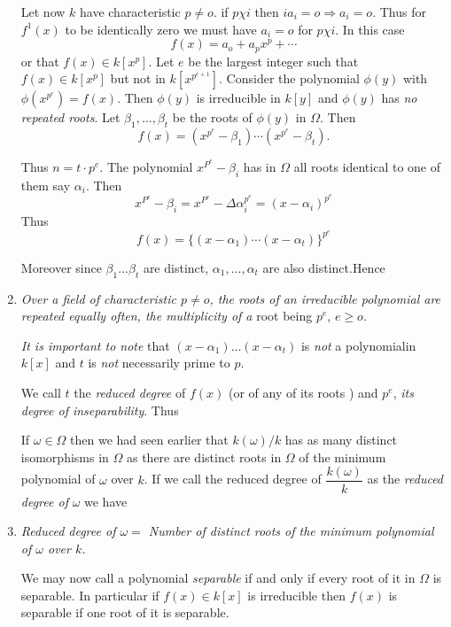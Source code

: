 \begin{enumerate}[1)]
Let now $k$ have characteristic $p \neq o$. if $p \chi i$ then $i a_i
= o \Rightarrow a_i = o$. Thus for $f^1 (x)$ to be identically zero we
must have $a_i = o$ for $p \chi i$. In this case 
$$
f(x) = a_o + a_p x^p + \cdots
$$
or that $f(x) \in k[x^p]$. Let $e$ be the largest integer such that $f
(x) \in k[ x^p ]$ but not in $k [x^{p^{e + 1}}]$. Consider the
polynomial $\phi (y)$ with $\phi (x^{p^e}) = f(x)$. Then $\phi (y)$ is
irreducible in $k[y]$ and $\phi (y)$ has \textit{no repeated
  roots}. Let $\beta_1, \ldots , \beta_t$ be the roots of $\phi (y)$
in $\Omega$. Then 
$$
f(x) = ( x^{p^e} - \beta_1 ) \cdots (x^{p^e} - \beta_t).
$$

Thus $n = t \cdot p^e$. The polynomial $x^{P^e} - \beta_i$ has in $\Omega$
all roots identical to one of them say  $\alpha_i$. Then 
$$
x^{P^e} - \beta_i = x^{P^e} - \Delta \alpha^{p^e}_i = (x - \alpha_i)^{p^e}
$$
Thus 
$$
f(x) = \{ (x - \alpha_1) \cdots (x - \alpha_t ) \}^{p^e}
$$


Moreover since $\beta_1 \ldots \beta_t$ are distinct, $\alpha_1 ,
\ldots ,\alpha_t$ are also distinct.\break Hence  

\item \textit{Over a field of characteristic $p \neq o$, the roots of
  an irreducible polynomial are repeated equally often, the
  multiplicity of a} root being $p^e$, $e \geq o$. 

\textit{It is important to note} that $(x - \alpha_1) \ldots (x  -
\alpha_t)$ is \textit{not} a polynomial\pageoriginale in $k[x]$ and
$t$ is \textit{not} necessarily prime to $p$.   

We call $t$ the \textit{reduced degree} of $f(x)$ (or of any of its
roots ) and $p^e$, \textit{its degree of inseparability}. Thus


If $\omega \in \Omega$ then we had seen earlier that $k(\omega) / k$
has as many distinct isomorphisms in $\Omega$ as there are distinct
roots in $\Omega$ of the minimum polynomial of $\omega$ over $k$. If
we call the reduced degree of $\dfrac{k(\omega)}{k}$ as the \textit{reduced 
  degree of} $\omega$ we have  

\item \textit{Reduced degree of $\omega = $ Number of distinct roots
  of the minimum polynomial of $\omega$ over $k$.} 

We may now call a polynomial \textit{separable} if and only if every
root of it in $\Omega$ is separable. In particular if $f(x) \in k[x]$
is irreducible then $f(x)$ is separable if one root of it is
separable. 


\end{enumerate}
